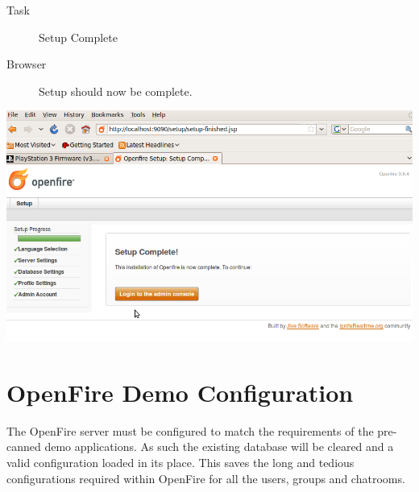 \begin{description}
\item [Task] Setup Complete
\item [Browser] Setup should now be complete.
\end{description}
\begin{center}
\includegraphics[scale=0.5]{figs/deploy/openfire-7.png} 
\end{center}

\section{OpenFire Demo Configuration}
The OpenFire server must be configured to match the requirements of the
pre-canned demo applications. As such the existing database will be cleared and a
valid configuration loaded in its place. This saves the long and tedious configurations
required within OpenFire for all the users, groups and chatrooms.

